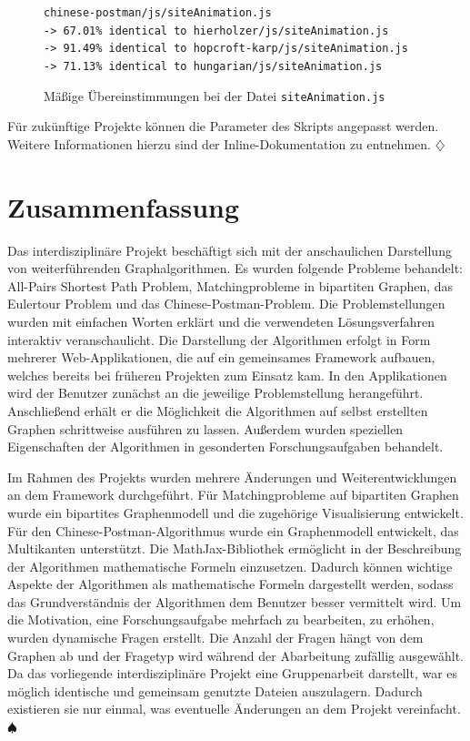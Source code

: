 \begin{figure}[h!]
\noindent\texttt{chinese-postman/js/siteAnimation.js \\
-> 67.01\% identical to hierholzer/js/siteAnimation.js \\
-> 91.49\% identical to hopcroft-karp/js/siteAnimation.js \\
-> 71.13\% identical to hungarian/js/siteAnimation.js
}
\caption[Gemeinsame Dateien: Beispiel 2]{Mäßige Übereinstimmungen bei der Datei \texttt{siteAnimation.js}}\label{fig:shared-files-2}
\end{figure}

Für zukünftige Projekte können die Parameter des Skripts angepasst werden. Weitere Informationen hierzu sind der Inline-Dokumentation zu entnehmen. \hfill$\diamondsuit$

\chapter{Zusammenfassung} %
Das interdisziplinäre Projekt beschäftigt sich mit der anschaulichen Darstellung von weiterführenden Graphalgorithmen. Es wurden folgende Probleme behandelt: All-Pairs Shortest Path Problem, Matchingprobleme in bipartiten Graphen, das Eulertour Problem und das Chinese-Postman-Problem. 
Die Problemstellungen wurden mit einfachen Worten erklärt und die verwendeten Lösungsverfahren interaktiv veranschaulicht. Die Darstellung der Algorithmen erfolgt in Form mehrerer Web-Applikationen, die auf ein gemeinsames Framework aufbauen, welches bereits bei früheren Projekten zum Einsatz kam. In den Applikationen wird der Benutzer zunächst an die jeweilige Problemstellung herangeführt. Anschließend erhält er die Möglichkeit die Algorithmen auf selbst erstellten Graphen schrittweise ausführen zu lassen. Außerdem wurden speziellen Eigenschaften der Algorithmen in gesonderten Forschungsaufgaben behandelt. 

Im Rahmen des Projekts wurden mehrere Änderungen und Weiterentwicklungen an dem Framework durchgeführt. Für Matchingprobleme auf bipartiten Graphen wurde ein bipartites Graphenmodell und die zugehörige Visualisierung entwickelt. Für den Chinese-Postman-Algorithmus wurde ein Graphenmodell entwickelt, das Multikanten unterstützt. 
Die MathJax-Bibliothek ermöglicht in der Beschreibung der Algorithmen mathematische Formeln einzusetzen. Dadurch können wichtige Aspekte der Algorithmen als mathematische Formeln dargestellt werden, sodass das Grundverständnis der Algorithmen dem Benutzer besser vermittelt wird.
Um die Motivation, eine Forschungsaufgabe mehrfach zu bearbeiten, zu erhöhen, wurden dynamische Fragen erstellt. Die Anzahl der Fragen hängt von dem Graphen ab und der Fragetyp wird während der Abarbeitung zufällig ausgewählt. Da das vorliegende interdisziplinäre Projekt eine Gruppenarbeit darstellt, war es möglich identische und gemeinsam genutzte Dateien auszulagern. Dadurch existieren sie nur einmal, was eventuelle Änderungen an dem Projekt vereinfacht. \hfill$\spadesuit$

